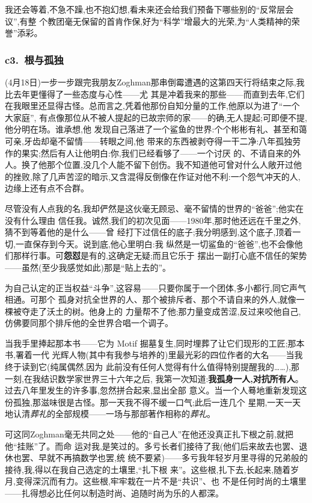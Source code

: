 我还会等着,不急不躁,也不抱幻想,看未来还会给我们预备下哪些别的“反常层会议”,有整
个教团毫无保留的首肯作保,好为“科学”增最大的光荣,为“人类精神的荣誉”添彩。

\subsubsection*{c3.~根与孤独}


(4月18日)一步一步跟完我朋友Zoghman那串倒霉遭遇的这第四天行将结束之际,我比去年更懂得了一些态度与心性——尤
其是冲着我来的那些——而直到去年,它们在我眼里还显得古怪。总而言之,凭着他那份自知分量的工作,他原以为进了“一个大家庭”,
有点像那位从不被人提起的已故宗师的家——的确,无人提起;可即便不提,他分明在场。谁承想,他
发现自己落进了一个鲨鱼的世界:个个彬彬有礼、甚至和蔼可亲,牙齿却毫不留情——转眼之间,他
带来的东西被剥夺得一干二净:八年孤独劳作的果实;然后有人让他明白:你,我们已经看够了——一个讨厌
的、不请自来的外人。换了他那个位置,没几个人能不留下创伤。我不知道他可曾对什么人敞开过他
的挫败,除了几声苦涩的暗示,又含混得反倒像在作证对他不利:一个怨气冲天的人,边缘上还有点不合群。

尽管没有人点我的名,我却俨然是这伙毫无顾忌、毫不留情的世界的“爸爸”;他实在没有什么理由
信任我。诚然,我们的初次见面——1980年,那时他还远在千里之外,猜不到等着他的是什么——曾
经打下过信任的底子;我分明感到,这个底子,顶着一切,一直保存到今天。说到底,他心里明白:我
纵然是一切鲨鱼的“爸爸”,也不会像他们那样行事。可\textbf{怨怼}是有的,这确定无疑;而且它乐于\dmark{}
摆出一副打心底不信任的架势——虽然(至少我感觉如此)那是“贴上去的”。

为自己认定的正当权益“斗争”,这容易——只要你属于一个团体,多小都行,同它声气相通。可那个
孤身对抗全世界的人、那个被排斥者、那个不请自来的外人,就像一棵被夺走了沃土的树。他身上的
力量帮不了他;那力量变成苦涩,反过来咬他自己,仿佛要同那个排斥他的全世界合唱一个调子。

当我手里捧起那本书——它为 Motif 掘墓复生,同时埋葬了让它们现形的工匠;那本书,署着一代
光辉人物(其中有我参与培养的)里最光彩的四位作者的大名——当我终于读到它(纯属偶然,因为
此前没有任何人觉得有什么值得特别提醒我的……),那一刻,在我结识数学家世界三十六年之后,
我第一次知道:\textbf{我孤身一人,对抗所有人}。过去八年里发生的许多事,忽然拼合起来,显出全部
意义。当一个人蓦地重新发现这份孤独,那滋味很是古怪。那一天我不得不缓一口气;此后一连几个
星期,一天一天地认清\emph{葬礼}的全部规模——一场与那部著作相称的\emph{葬礼}。

可这同Zoghman毫无共同之处——他的“自己人”在他还没真正扎下根之前,就把他“挂账”了。而命
运对我,是笑过的。多亏长者们接待了我(他们后来故去也罢、退休也罢、早就不再搞数学也罢,统
统不要紧)——多亏我年轻岁月里寻得的兄弟般的接待,我,得以在我自己选定的土壤里,“扎下根
来”。这些根,扎下去,长起来,随着岁月,变得深沉而有力。这些根,牢牢栽在一片不是“共识”、也
不是任何时尚的土壤里——扎得想必比任何以制造时尚、追随时尚为乐的人都深。

